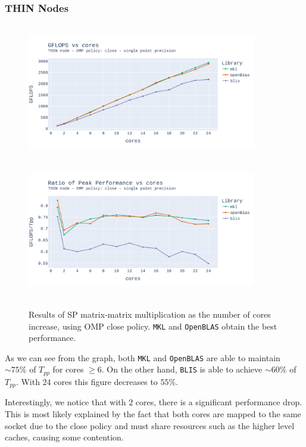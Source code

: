 \documentclass{report}
\begin{document}
\subsubsection{THIN Nodes}
\begin{figure}[H]
\hspace*{-2.5cm}
\includegraphics[width=10cm, height=6cm]{./images/fixed_size_thin_float_gflops_close.pdf}
\includegraphics[width=10cm, height=6cm]{./images/fixed_size_thin_float_gflops_close_ratio.pdf}
\caption{\label{fig:fixed_size_thin_float_close} Results of SP matrix-matrix 
    multiplication as the number of cores increase, using OMP close policy. 
    \texttt{MKL} and \texttt{OpenBLAS} obtain the best performance.}
\end{figure}

As we can see from the graph, both \texttt{MKL} and \texttt{OpenBLAS} are able 
to maintain $\sim 75\%$ of $T_{pp}$ for cores $\geq 6$. On the other 
hand, \texttt{BLIS} is able to achieve $\sim 60\%$ of $T_{pp}$. With $24$ cores 
this figure decreases to $55\%$. 

Interestingly, we notice that with $2$ cores, there is a significant performance 
drop. This is most likely explained by the fact that both cores are mapped to the 
same socket due to the close policy and must share resources such as the higher 
level caches, causing some contention.
\end{document}
